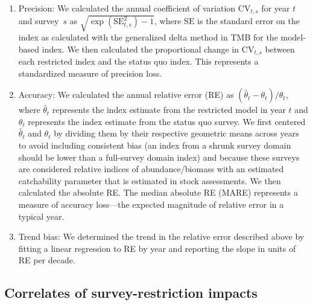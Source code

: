 \documentclass[12pt]{article}
\begin{document}
\begin{enumerate}
  \item Precision: We calculated the annual coefficient of variation $\mathrm{CV}_{t,s}$ for year $t$ and survey~$s$ as $\sqrt{\exp(\mathrm{SE}_{t,s}^2) - 1}$, where $\mathrm{SE}$ is the standard error on the index as calculated with the generalized delta method in TMB \citep{kristensen2016} for the model-based index. We then calculated the proportional change in $\mathrm{CV}_{t,s}$ between each restricted index and the status quo index. This represents a standardized measure of precision loss.

    \item Accuracy: We calculated the annual relative error (RE) as $(\hat{\theta}_t - \theta_t) / \theta_t$, where $\hat{\theta}_t$ represents the index estimate from the restricted model in year $t$ and $\theta_t$ represents the index estimate from the status quo survey. We first centered $\hat{\theta}_t$ and $\theta_t$ by dividing them by their respective geometric means across years to avoid including consistent bias (an index from a shrunk survey domain should be lower than a full-survey domain index) and because these surveys are considered relative indices of abundance/biomass with an estimated catchability parameter that is estimated in stock assessments. We then calculated the absolute RE. The median absolute RE (MARE) represents a measure of accuracy loss---the expected magnitude of relative error in a typical year.

    \item Trend bias: We determined the trend in the relative error described above by fitting a linear regression to RE by year and reporting the slope in units of RE per decade.

\end{enumerate}

\subsection*{Correlates of survey-restriction impacts}
\end{document}
